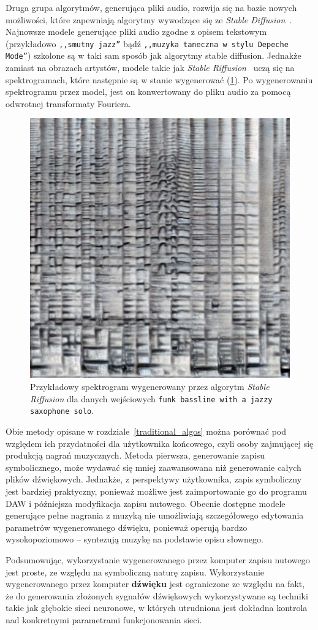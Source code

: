 Druga grupa algorytmów, generująca pliki audio, rozwija się na bazie nowych możliwości,
które zapewniają algorytmy wywodzące się ze \textit{Stable Diffusion}~\cite{stablediffusion}.
Najnowsze modele generujące pliki audio zgodne z opisem tekstowym 
(przykładowo \texttt{,,smutny jazz''} bądź \texttt{,,muzyka taneczna w stylu Depeche Mode''})
szkolone są w taki sam sposób jak algorytmy stable diffusion. 
Jednakże zamiast na obrazach artystów, modele takie jak \textit{Stable Riffusion}~\cite{riffusion} 
uczą się na spektrogramach, które następnie są w stanie wygenerować (\ref{fig:riffusion_spectro}).
Po wygenerowaniu spektrogramu przez model,
jest on konwertowany do pliku audio za pomocą odwrotnej transformaty Fouriera.

\begin{figure}[H]\label{fig:riffusion_spectro}
    \centering
    \includegraphics[width=0.4\linewidth]{rys01/riffusion_spectro.jpg}
    \caption{Przykładowy spektrogram wygenerowany przez algorytm \textit{Stable Riffusion} dla danych wejściowych \texttt{funk bassline with a jazzy saxophone solo}.}
\end{figure}


Obie metody opisane w rozdziale~\ref{traditional_algos} można porównać pod względem ich przydatności
dla użytkownika końcowego, czyli osoby zajmującej się produkcją nagrań muzycznych. Metoda pierwsza, 
generowanie zapisu symbolicznego, może wydawać się mniej zaawansowana niż generowanie całych plików dźwiękowych.
Jednakże, z perspektywy użytkownika, zapis symboliczny jest bardziej praktyczny,
ponieważ możliwe jest zaimportowanie go do programu DAW i późniejsza modyfikacja zapisu nutowego.
Obecnie dostępne modele generujące pełne nagrania z muzyką nie umożliwiają
szczegółowego edytowania parametrów wygenerowanego dźwięku, ponieważ operują bardzo wysokopoziomowo 
-- syntezują muzykę na podstawie opisu słownego.

Podsumowując, wykorzystanie wygenerowanego przez komputer zapisu nutowego jest proste, ze względu na symboliczną naturę zapisu.
Wykorzystanie wygenerowanego przez komputer \textbf{dźwięku} jest ograniczone ze względu na fakt, że do generowania złożonych sygnałów dźwiękowych wykorzystywane są techniki takie jak głębokie sieci neuronowe, w których utrudniona jest dokładna kontrola nad konkretnymi parametrami funkcjonowania sieci.

